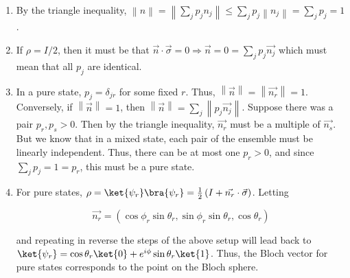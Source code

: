 \begin{enumerate}
\item By the triangle inequality, $\left\lVert n \right\rVert = \left\lVert
\sum_j{p_j n_j} \right\rVert \le \sum_j{p_j \left\lVert n_j \right\rVert} =
\sum_j{p_j} = 1$.

\item If $\rho = I / 2$, then it must be that $\vec{n} \cdot \vec{\sigma} = 0
\Rightarrow \vec{n} = 0 = \sum_j{p_j \vec{n_j}}$ which must mean that all $p_j$
are identical.

\item In a pure state, $p_j = \delta_{jr}$ for some fixed $r$. Thus,
$\left\lVert \vec{n} \right\rVert = \left\lVert \vec{n_r} \right\rVert = 1$.
Conversely, if $\left\lVert \vec{n} \right\rVert = 1$, then $\left\lVert \vec{n}
\right\rVert = \sum_j{\left\lVert p_j \vec{n_j} \right\rVert}$.  Suppose there
was a pair $p_r, p_s > 0$. Then by the triangle inequality, $\vec{n_r}$ must be
a multiple of $\vec{n_s}$. But we know that in a mixed state, each pair of the
ensemble must be linearly independent. Thus, there can be at most one $p_r > 0$,
and since $\sum_j{p_j} = 1 = p_r$, this must be a pure state.

\item For pure states, $\rho = \ket{\psi_r} \bra{\psi_r} = \frac{1}{2} \left( I
+ \vec{n_r} \cdot \vec{\sigma} \right)$. Letting

$$
\vec{n_r} = \left( \cos \phi_r \sin \theta_r, \sin \phi_r \sin \theta_r, \cos
\theta_r \right)
$$

and
repeating in reverse the steps of the above setup will lead back to
$\ket{\psi_r} = \cos \theta_r \ket{0} + e^{i \phi} \sin \theta_r \ket{1}$. Thus,
the Bloch vector for pure states corresponds to the point on the Bloch sphere.
\end{enumerate}
